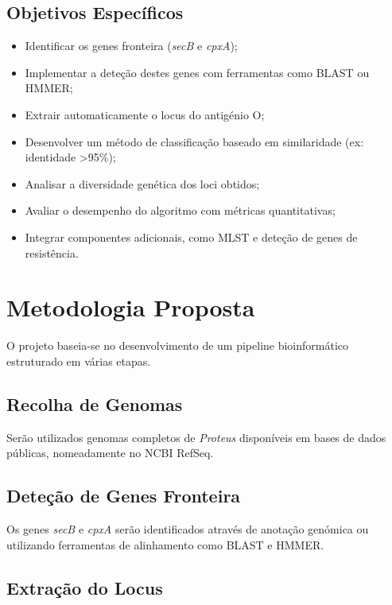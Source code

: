 \documentclass[a4paper,11pt]{article}
\begin{document}
\subsection{Objetivos Específicos}

\begin{itemize}
    \item Identificar os genes fronteira (\textit{secB} e \textit{cpxA});
    \item Implementar a deteção destes genes com ferramentas como BLAST ou HMMER;
    \item Extrair automaticamente o locus do antigénio O;
    \item Desenvolver um método de classificação baseado em similaridade (ex: identidade >95\%);
    \item Analisar a diversidade genética dos loci obtidos;
    \item Avaliar o desempenho do algoritmo com métricas quantitativas;
    \item Integrar componentes adicionais, como MLST e deteção de genes de resistência.
\end{itemize}

\section{Metodologia Proposta}

O projeto baseia-se no desenvolvimento de um pipeline bioinformático estruturado em várias etapas.

\subsection{Recolha de Genomas}

Serão utilizados genomas completos de \textit{Proteus} disponíveis em bases de dados públicas, nomeadamente no NCBI RefSeq.

\subsection{Deteção de Genes Fronteira}

Os genes \textit{secB} e \textit{cpxA} serão identificados através de anotação genómica ou utilizando ferramentas de alinhamento como BLAST e HMMER.

\subsection{Extração do Locus}
\end{document}
